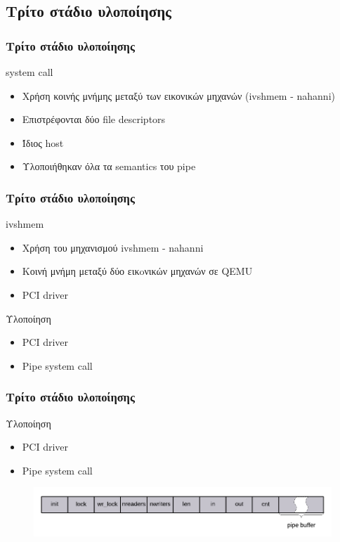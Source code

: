 \documentclass[red,slidestop,notes,compress,mathserif]{beamer}
\begin{document}
\subsection{Τρίτο στάδιο υλοποίησης}
\begin{frame}
\frametitle{Τρίτο στάδιο υλοποίησης}
\begin{block}{system call}
\begin{itemize}
\item Χρήση κοινής μνήμης μεταξύ των εικονικών μηχανών (ivshmem - nahanni)
\item Επιστρέφονται δύο file descriptors
\item Ίδιος host
\item Υλοποιήθηκαν όλα τα semantics του pipe 
\end{itemize}
\end{block}
\end{frame}

\begin{frame}
\frametitle{Τρίτο στάδιο υλοποίησης}
\begin{block}{ivshmem}
\begin{itemize}
\item Χρήση του μηχανισμού ivshmem - nahanni
\item Κοινή μνήμη μεταξύ δύο εικoνικών μηχανών σε QEMU
\item PCI driver 
\end{itemize}
\end{block}
\begin{block}{Υλοποίηση}
\begin{itemize}
\item PCI driver 
\item Pipe system call 
\end{itemize}
\end{block}
\end{frame}

\begin{frame}
\frametitle{Τρίτο στάδιο υλοποίησης}
\begin{block}{Υλοποίηση}
\begin{itemize}
\item PCI driver 
\item Pipe system call 
\end{itemize}
\end{block}
\begin{figure}
\center
\includegraphics[scale=0.8]{figures/shared_memoery_layout.png}
\end{figure}
\end{frame}
\end{document}
